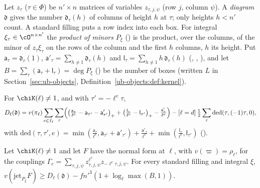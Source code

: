 Let $z_\tau$ ($\tau\in\Phi$) be $n'\times n$ matrices of variables $z_{\tau,j,\psi}$ (row $j$, column
$\psi$). A \emph{diagram} $\mathfrak d$ gives the number $\mathfrak d_\tau(h)$ of columns of height
$h$ at $\tau$; only heights $h<n'$ count. A standard filling puts a row index into each box. For
integral $\xi_\tau\in\cO^{n\times n'}$ the \emph{product of minors} $P_\xi$ () is
the product, over the columns, of the minor of $z_\tau\xi_\tau$ on the rows of the column and the
first $h$ columns, $h$ its height. Put $\mathsf a_\tau=\mathfrak d_\tau(1)$,
$\mathsf a'_\tau=\sum_{h\ne1}\mathfrak d_\tau(h)$ and $\mathsf l_\tau=\sum_{h\ne1}h\,\mathfrak d_\tau(h)$
(, , ), and let
$B=\sum_\tau(\mathsf a_\tau+\mathsf l_\tau)=\deg P_\xi$ () be the number of
boxes (written $L$ in Section~\ref{sec:ub-objects}, Definition~\ref{ub-objects:def:kernel}).

\begin{definition}\label{der:def:pred}
For $\chiK(\ell)\ne1$, and with $\tau'=-\ell^e\tau$,
\[
D_\ell(\mathfrak d)=v(\pi_\ell)\sum_{e\in I_\ell}\sum_\tau\Bigl(\bigl(\tfrac{\mathsf a_\tau}{\ell^e}-\mathsf a_{\tau'}
-\mathsf a'_{\tau'}\bigr)_++\bigl(\tfrac{\mathsf l_\tau}{\ell^e}-\mathsf l_{\tau'}\bigr)_+
-\tfrac{\mathsf a'_\tau}{\ell^e}\Bigr)-[\ell=d]\,\tfrac12\sum_\tau\mathrm{ded}(\tau,(-1)\tau,0),
\]
with $\mathrm{ded}(\tau,\tau',e)=\min(\frac{\mathsf a_\tau}{\ell^e},\mathsf a_{\tau'}+\mathsf a'_{\tau'})
+\frac{\mathsf a'_\tau}{\ell^e}+\min(\frac{\mathsf l_\tau}{\ell^e},\mathsf l_{\tau'})$ ().
\end{definition}

\begin{theorem}
\label{der:thm:count}
Let $\chiK(\ell)\ne1$ and let $F$ have the normal form at $\ell$, with $v(\varpi)=\rho_\ell$, for the
couplings $\Gamma_e=\sum_{\tau,j,\psi}z_{\tau,j,\psi}^{\ell^e}z_{-\ell^e\tau,j,\psi}$. For every
standard filling and integral $\xi$,
$v(\mathrm{jet}_{P_\xi}F)\ge D_\ell(\mathfrak d)-fn'^3(1+\log_\ell\max(B,1))$.
\end{theorem}

